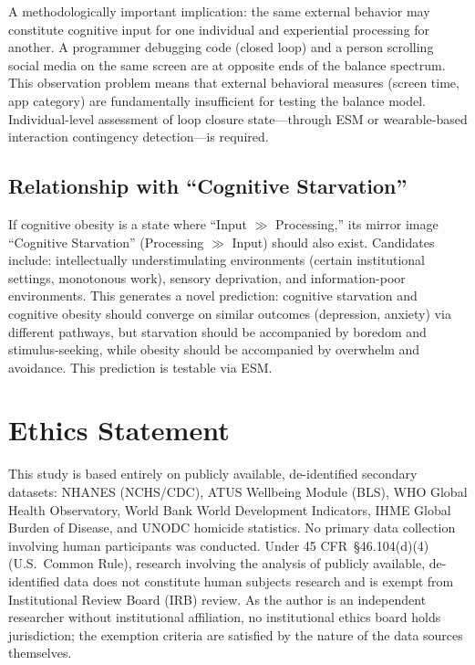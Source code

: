 \documentclass[a4paper,11pt,titlepage]{article}
\begin{document}
A methodologically important implication: the same external behavior may constitute cognitive input for one individual and experiential processing for another. A programmer debugging code (closed loop) and a person scrolling social media on the same screen are at opposite ends of the balance spectrum. This observation problem means that external behavioral measures (screen time, app category) are fundamentally insufficient for testing the balance model. Individual-level assessment of loop closure state---through ESM or wearable-based interaction contingency detection---is required.


\subsection{Relationship with ``Cognitive Starvation''}

If cognitive obesity is a state where ``Input $\gg$ Processing,'' its mirror image ``Cognitive Starvation'' (Processing $\gg$ Input) should also exist. Candidates include: intellectually understimulating environments (certain institutional settings, monotonous work), sensory deprivation, and information-poor environments. This generates a novel prediction: cognitive starvation and cognitive obesity should converge on similar outcomes (depression, anxiety) via different pathways, but starvation should be accompanied by boredom and stimulus-seeking, while obesity should be accompanied by overwhelm and avoidance. This prediction is testable via ESM.


\section*{Ethics Statement}

This study is based entirely on publicly available, de-identified secondary datasets: NHANES (NCHS/CDC), ATUS Wellbeing Module (BLS), WHO Global Health Observatory, World Bank World Development Indicators, IHME Global Burden of Disease, and UNODC homicide statistics. No primary data collection involving human participants was conducted. Under 45 CFR~\S46.104(d)(4) (U.S.\ Common Rule), research involving the analysis of publicly available, de-identified data does not constitute human subjects research and is exempt from Institutional Review Board (IRB) review. As the author is an independent researcher without institutional affiliation, no institutional ethics board holds jurisdiction; the exemption criteria are satisfied by the nature of the data sources themselves.
\end{document}
